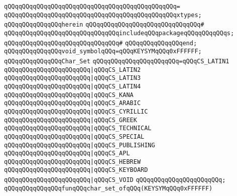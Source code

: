 \verb|qQQqqQQqqQQqqQQqqQQqqQQqqQQqqQQqqQQqqQQqqQQqqQQq=|\newline
\verb|qQQqqQQqqQQqqQQqqQQqqQQqqQQqqQQqqQQqqQQqqQQqqQQqxtypes;|\newline
\verb|qQQqqQQqqQQqqQQqherein|\newline
\verb|qQQqqQQqqQQqqQQqqQQqqQQqqQQqqQQq#|\newline
\verb|qQQqqQQqqQQqqQQqqQQqqQQqqQQqqQQqincludeqQQqpackageqQQqqQQqqQQqs;|\newline
\verb|qQQqqQQqqQQqqQQqqQQqqQQqqQQqqQQq#|\newline
\verb|qQQqqQQqqQQqqQQqend;|\newline
\newline
\verb|qQQqqQQqqQQqqQQqvoid_symbolqQQq=qQQqKEYSYMqQQq0xFFFFFF;|\newline
\newline
\verb|qQQqqQQqqQQqqQQqChar_Set|\newline
\verb|qQQqqQQqqQQqqQQqqQQqqQQq=qQQqCS_LATIN1|\newline
\verb|qQQqqQQqqQQqqQQqqQQqqQQq|\verb#|qQQqCS_LATIN2#\newline
\verb|qQQqqQQqqQQqqQQqqQQqqQQq|\verb#|qQQqCS_LATIN3#\newline
\verb|qQQqqQQqqQQqqQQqqQQqqQQq|\verb#|qQQqCS_LATIN4#\newline
\verb|qQQqqQQqqQQqqQQqqQQqqQQq|\verb#|qQQqCS_KANA#\newline
\verb|qQQqqQQqqQQqqQQqqQQqqQQq|\verb#|qQQqCS_ARABIC#\newline
\verb|qQQqqQQqqQQqqQQqqQQqqQQq|\verb#|qQQqCS_CYRILLIC#\newline
\verb|qQQqqQQqqQQqqQQqqQQqqQQq|\verb#|qQQqCS_GREEK#\newline
\verb|qQQqqQQqqQQqqQQqqQQqqQQq|\verb#|qQQqCS_TECHNICAL#\newline
\verb|qQQqqQQqqQQqqQQqqQQqqQQq|\verb#|qQQqCS_SPECIAL#\newline
\verb|qQQqqQQqqQQqqQQqqQQqqQQq|\verb#|qQQqCS_PUBLISHING#\newline
\verb|qQQqqQQqqQQqqQQqqQQqqQQq|\verb#|qQQqCS_APL#\newline
\verb|qQQqqQQqqQQqqQQqqQQqqQQq|\verb#|qQQqCS_HEBREW#\newline
\verb|qQQqqQQqqQQqqQQqqQQqqQQq|\verb#|qQQqCS_KEYBOARD#\newline
\verb|qQQqqQQqqQQqqQQqqQQqqQQq|\verb#|qQQqCS_VOID#\newline
\verb|qQQqqQQqqQQqqQQqqQQqqQQq;|\newline
\newline
\verb|qQQqqQQqqQQqqQQqfunqQQqchar_set_ofqQQq(KEYSYMqQQq0xFFFFFF)|\newline
